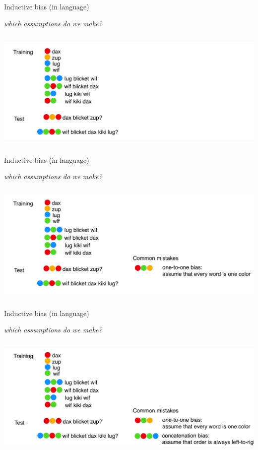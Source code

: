 \documentclass[aspectratio=169,t,handout,xcolor={usenames,dvipsnames}]{beamer}
\begin{document}
\begin{frame}{Inductive bias (in language)}
\centerline{\textit{which assumptions do we make?}}
\centering\includegraphics[height=5.9cm]{image/Jietu20220328-190213.jpg}

\end{frame}

\begin{frame}{Inductive bias (in language)}
\centerline{\textit{which assumptions do we make?}}
\centering\includegraphics[height=5.9cm]{image/Jietu20220328-190532.jpg}

\end{frame}

\begin{frame}{Inductive bias (in language)}
\centerline{\textit{which assumptions do we make?}}
\centering\includegraphics[height=5.9cm]{image/Jietu20220328-190839.jpg}

\end{frame}
\end{document}
